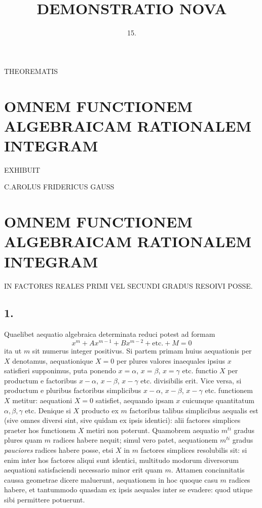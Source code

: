 \documentclass[twoside,12pt, showframe]{memoir}
\begin{document}
\setlength{\abovedisplayskip}{0.33\baselineskip plus .25\baselineskip minus .25\baselineskip}
\setlength{\belowdisplayskip}{0.33\baselineskip plus .25\baselineskip minus .25\baselineskip}

\title{DEMONSTRATIO NOVA }


\author{15.}
\date{}


\maketitle
THEOREMATIS

\section*{OMNEM FUNCTIONEM ALGEBRAICAM RATIONALEM INTEGRAM}
EXHIBUIT

C.AROLUS FRIDERICUS GAUSS

\section*{OMNEM FUNCTIONEM ALGEBRAICAM RATIONALEM INTEGRAM }
IN FACTORES REALES PRIMI VEL SECUNDI GRADUS RESOIVI POSSE.

\subsection*{1.}

Quaelibet aequatio algebraica determinata reduci potest ad formam \[ x^m + Ax^{m-1} + Bx^{m-2} + \text{etc{.}} + M = 0 \] ita ut \(m\) sit numerus integer positivus. Si partem primam huius aequationis per \(X\) denotamus, aequationique \(X = 0\) per plures valores inaequales ipsius \(x\) satisfieri supponimus, puta ponendo \(x=\alpha\), \(x =\beta\), \(x = \gamma\) etc{.} functio \(X\) per productum e factoribus \(x-\alpha\), \(x-\beta\), \(x-\gamma\) etc{.} divisibilis erit. Vice versa, si productum e pluribus factoribus simplicibus \(x-\alpha\), \(x-\beta\), \(x-\gamma\) etc{.} functionem \(X\) metitur: aequationi \(X= 0\) satisfiet, aequando ipsam \(x\) cuicunque quantitatum \(\alpha, \beta, \gamma\) etc{.} Denique si \(X\) producto ex \(m\) factoribus talibus simplicibus aequalis est (sive omnes diversi sint, sive quidam ex ipsis identici): alii factores simplices praeter hos functionem \(X\) metiri non poterunt. Quamobrem aequatio \(m^{ti}\) gradus plures quam \(m\) radices habere nequit; simul vero patet, aequationem \(m^{ti}\) gradus \textit{pauciores} radices habere posse, etsi \(X\) in \(m\) factores simplices resolubilis sit: si enim inter hos factores aliqui sunt identici, multitudo modorum diversorum aequationi satisfaciendi necessario minor erit quam \(m\). Attamen concinnitatis caussa geometrae dicere maluerunt, aequationem in hoc quoque casu \(m\) radices habere, et tantummodo quasdam ex ipsis aequales inter se evadere: quod utique sibi permittere potuerunt.
\end{document}
